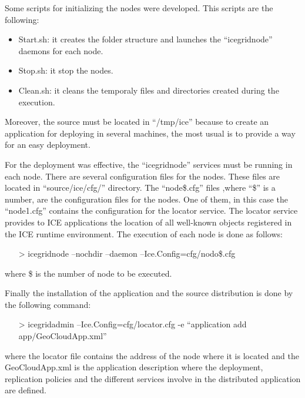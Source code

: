 Some scripts for initializing the nodes were developed. This scripts are the
following: 
\begin{itemize}
\item Start.sh: it creates the folder structure and launches the
  ``icegridnode'' daemons for each node.
\item Stop.sh: it stop the nodes.
\item Clean.sh: it cleans the temporaly files and directories created during the execution.
\end{itemize}

Moreover, the source must be located in ``/tmp/ice'' because to create an application for
deploying in several machines, the most usual is to provide a way for an easy
deployment. 

For the deployment was effective, the ``icegridnode'' services must be running
in each node. 
There are several configuration files for the nodes. These files are located in
``source/ice/cfg/'' directory. The ``node\$.cfg'' files ,where ``\$'' is a number,
are the configuration files for the nodes. One of them, in this case the
``node1.cfg'' contains the configuration for the locator service. 
The locator service provides to ICE applications the location of all well-known
objects registered in the ICE runtime environment. 
The execution of each node is done as follows:
\begin{itemize}
\item[>]icegridnode --nochdir --daemon --Ice.Config=cfg/nodo\$.cfg
\end{itemize}
where \$ is the number of node to be executed.
 
Finally the installation of the application and the source distribution is done
by the following command:
\begin{itemize}
\item[>]icegridadmin --Ice.Config=cfg/locator.cfg -e ``application add
  app/GeoCloudApp.xml''
\end{itemize}

where the locator file contains the address of the node where it is located and
the GeoCloudApp.xml is the application description where the deployment,
replication policies and the different services involve in the distributed
application are defined.

